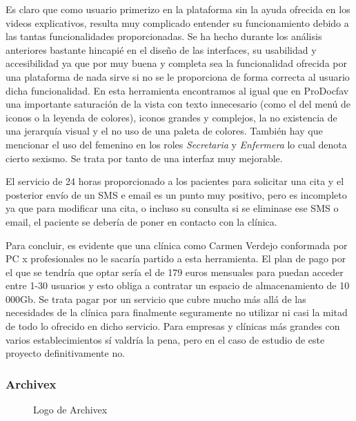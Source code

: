 Es claro que como usuario primerizo en la plataforma sin la ayuda ofrecida en los videos explicativos, resulta muy complicado entender su funcionamiento debido a las tantas funcionalidades proporcionadas. Se ha hecho durante los análisis anteriores bastante hincapié en el diseño de las interfaces, su usabilidad y accesibilidad ya que por muy buena y completa sea la funcionalidad ofrecida por una plataforma de nada sirve si no se le proporciona de forma correcta al usuario dicha funcionalidad. En esta herramienta encontramos al igual que en ProDocfav una importante saturación de la vista con texto innecesario (como el del menú de iconos o la leyenda de colores), iconos grandes y complejos, la no existencia de una jerarquía visual y el no uso de una paleta de colores. También hay que mencionar el uso del femenino en los roles \textit{Secretaria} y \textit{Enfermera} lo cual denota cierto sexismo. Se trata por tanto de una interfaz muy mejorable. \bigskip

El servicio de 24 horas proporcionado a los pacientes para solicitar una cita y el posterior envío de un SMS e email es un punto muy positivo, pero es incompleto ya que para modificar una cita, o incluso su consulta si se eliminase ese SMS o email, el paciente se debería de poner en contacto con la clínica.\bigskip

Para concluir, es evidente que una clínica como Carmen Verdejo conformada por PC x profesionales no le sacaría partido a esta herramienta. El plan de pago por el que se tendría que optar sería el de 179 euros mensuales para puedan acceder entre 1-30 usuarios y esto obliga a contratar un espacio de almacenamiento de 10 000Gb. Se trata pagar por un servicio que cubre mucho más allá de las necesidades de la clínica para finalmente seguramente no utilizar ni casi la mitad de todo lo ofrecido en dicho servicio. Para empresas y clínicas más grandes con varios establecimientos sí valdría la pena, pero en el caso de estudio de este proyecto definitivamente no.

\subsubsection*{Archivex}

\begin{figure}[H]
    \caption{Logo de Archivex}
    \label{fig:archivex-logo}
\end{figure}

